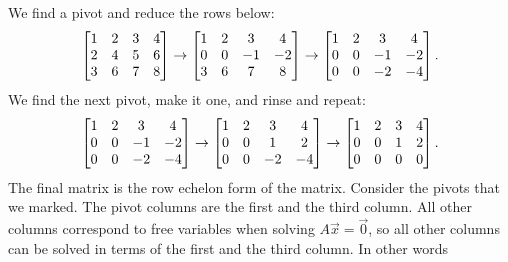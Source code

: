\documentclass{ximera}
\begin{document}
\begin{exampleSol}
    We find a pivot and reduce the rows below:
    \begin{equation*}
        \begin{bmatrix}
            1 & 2 & 3 & 4 \\
            2 & 4 & 5 & 6 \\
            3 & 6 & 7 & 8
        \end{bmatrix} 
        \to
        \begin{bmatrix}
            1 & 2 & 3 & 4 \\
            0 & 0 & -1 & -2 \\
            3 & 6 & 7 & 8
        \end{bmatrix} 
        \to
        \begin{bmatrix}
            1 & 2 & 3 & 4 \\
            0 & 0 & -1 & -2 \\
            0 & 0 & -2 & -4
        \end{bmatrix} .
    \end{equation*}
    We find the next pivot, make it one, and rinse and repeat:
    \begin{equation*}
        \begin{bmatrix}
            1 & 2 & 3 & 4 \\
            0 & 0 & -1 & -2 \\
            0 & 0 & -2 & -4
        \end{bmatrix} 
        \to
        \begin{bmatrix}
            1 & 2 & 3 & 4 \\
            0 & 0 & 1 & 2 \\
            0 & 0 & -2 & -4
        \end{bmatrix} 
        \to
        \begin{bmatrix}
            1 & 2 & 3 & 4 \\
            0 & 0 & 1 & 2 \\
            0 & 0 & 0 & 0
        \end{bmatrix} . 
    \end{equation*}
    The final matrix is the row echelon form of the matrix. Consider the pivots that we marked. The pivot columns are the first and the third column.  All other columns correspond to free variables when solving $A \vec{x} = \vec{0}$, so all other columns can be solved in terms of the first and the third column.  In other words

\end{exampleSol}
\end{document}
